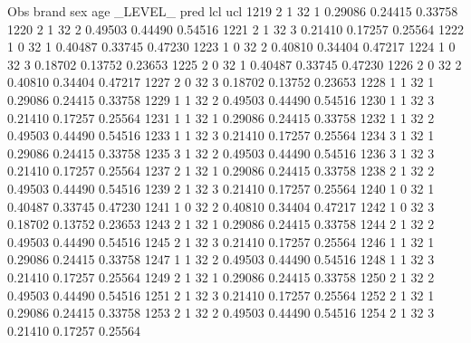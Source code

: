 \documentclass{article}
\begin{document}
\begin{Woutput}
 Obs    brand    sex    age    _LEVEL_      pred       lcl        ucl
1219      2       1      32       1       0.29086    0.24415    0.33758
1220      2       1      32       2       0.49503    0.44490    0.54516
1221      2       1      32       3       0.21410    0.17257    0.25564
1222      1       0      32       1       0.40487    0.33745    0.47230
1223      1       0      32       2       0.40810    0.34404    0.47217
1224      1       0      32       3       0.18702    0.13752    0.23653
1225      2       0      32       1       0.40487    0.33745    0.47230
1226      2       0      32       2       0.40810    0.34404    0.47217
1227      2       0      32       3       0.18702    0.13752    0.23653
1228      1       1      32       1       0.29086    0.24415    0.33758
1229      1       1      32       2       0.49503    0.44490    0.54516
1230      1       1      32       3       0.21410    0.17257    0.25564
1231      1       1      32       1       0.29086    0.24415    0.33758
1232      1       1      32       2       0.49503    0.44490    0.54516
1233      1       1      32       3       0.21410    0.17257    0.25564
1234      3       1      32       1       0.29086    0.24415    0.33758
1235      3       1      32       2       0.49503    0.44490    0.54516
1236      3       1      32       3       0.21410    0.17257    0.25564
1237      2       1      32       1       0.29086    0.24415    0.33758
1238      2       1      32       2       0.49503    0.44490    0.54516
1239      2       1      32       3       0.21410    0.17257    0.25564
1240      1       0      32       1       0.40487    0.33745    0.47230
1241      1       0      32       2       0.40810    0.34404    0.47217
1242      1       0      32       3       0.18702    0.13752    0.23653
1243      2       1      32       1       0.29086    0.24415    0.33758
1244      2       1      32       2       0.49503    0.44490    0.54516
1245      2       1      32       3       0.21410    0.17257    0.25564
1246      1       1      32       1       0.29086    0.24415    0.33758
1247      1       1      32       2       0.49503    0.44490    0.54516
1248      1       1      32       3       0.21410    0.17257    0.25564
1249      2       1      32       1       0.29086    0.24415    0.33758
1250      2       1      32       2       0.49503    0.44490    0.54516
1251      2       1      32       3       0.21410    0.17257    0.25564
1252      2       1      32       1       0.29086    0.24415    0.33758
1253      2       1      32       2       0.49503    0.44490    0.54516
1254      2       1      32       3       0.21410    0.17257    0.25564

\end{Woutput}
\end{document}
